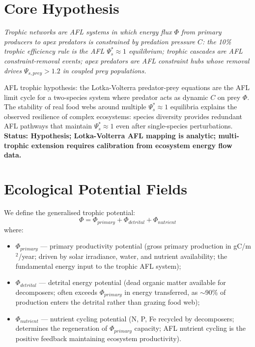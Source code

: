 \documentclass[11pt]{article}
\begin{document}
\section{Core Hypothesis}

\begin{center}
\textit{
Trophic networks are AFL systems in which energy flux $\Phi$ from primary producers to apex
predators is constrained by predation pressure $C$: the 10\% trophic efficiency rule is the AFL
$\Psi_s^* \approx 1$ equilibrium; trophic cascades are AFL constraint-removal events; apex predators
are AFL constraint hubs whose removal drives $\Psi_{s,prey} > 1.2$ in coupled prey populations.
}
\end{center}

AFL trophic hypothesis: the Lotka-Volterra predator-prey equations are the AFL limit cycle for
a two-species system where predator acts as dynamic $C$ on prey $\Phi$. The stability of real
food webs around multiple $\Psi_s^* \approx 1$ equilibria explains the observed resilience of
complex ecosystems: species diversity provides redundant AFL pathways that maintain $\Psi_s^* \approx 1$
even after single-species perturbations.
\textbf{Status: Hypothesis; Lotka-Volterra AFL mapping is analytic; multi-trophic extension
requires calibration from ecosystem energy flow data.}

\section{Ecological Potential Fields}

We define the generalised trophic potential:
\begin{equation}
\Phi = \Phi_{primary} + \Phi_{detrital} + \Phi_{nutrient}
\end{equation}
where:
\begin{itemize}
    \item $\Phi_{primary}$ --- primary productivity potential (gross primary production in gC/m$^2$/year;
          driven by solar irradiance, water, and nutrient availability; the fundamental energy
          input to the trophic AFL system);
    \item $\Phi_{detrital}$ --- detrital energy potential (dead organic matter available for
          decomposers; often exceeds $\Phi_{primary}$ in energy transferred, as $\sim$90\% of
          production enters the detrital rather than grazing food web);
    \item $\Phi_{nutrient}$ --- nutrient cycling potential (N, P, Fe recycled by decomposers;
          determines the regeneration of $\Phi_{primary}$ capacity; AFL nutrient cycling is the
          positive feedback maintaining ecosystem productivity).
\end{itemize}
\end{document}
